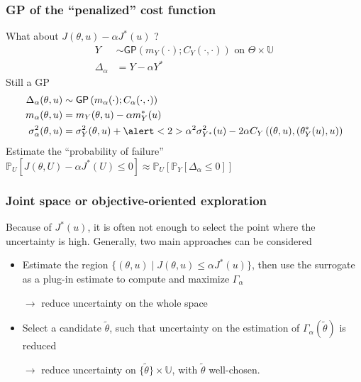 \documentclass[11pt]{beamer}
\newcommand{\GP}{\mathsf{GP}}
\newcommand{\Prob}{\mathbb{P}}
\newcommand{\kk}{\theta}
\newcommand{\uu}{u}
\newcommand{\UU}{U}
\newcommand{\Uspace}{\mathbb{U}}
\newcommand{\Kspace}{\Theta}
\begin{document}
\begin{frame}
  \frametitle{GP of the ``penalized'' cost function}
   What about $J(\kk, \uu) - \alpha J^*(\uu)$ ?
  \begin{align}
    Y &\sim \GP\left(m_Y(\cdot); C_Y(\cdot, \cdot)\right) \text{ on } \Kspace \times \Uspace \\
    \Delta_{\alpha} &= Y - \alpha Y^*
  \end{align}
  Still a GP
  \begin{align}
    \Delta_{\alpha}(\kk, \uu) &\sim \GP\left(m_{\alpha}(\cdot);C_{\alpha}(\cdot, \cdot) \right) \\
    m_{\alpha}(\kk,\uu)   &= m_Y(\kk, \uu) - \alpha m_Y^*(\uu) \\
    \sigma^2_{\alpha}(\kk, \uu) &= \sigma^2_{Y}(\kk, \uu) +  \alert<2>{\alpha^2\sigma^2_{Y^*}(\uu)}- 2\alpha C_Y\left((\kk, \uu), ({\kk}_Y^ *(\uu), \uu)\right)
  \end{align}
  Estimate the  ``probability of failure''~\cite{bect_sequential_2012,echard_ak-mcs_2011}
 $\Prob_{\UU}\left[J(\kk, \UU) - \alpha J^*(\UU) \leq 0\right] \approx \Prob_{\UU}\left[\Prob_Y\left[\Delta_{\alpha} \leq 0\right]\right]$
  \end{frame}
\begin{frame}
  \frametitle{Joint space or objective-oriented exploration}
  Because of $J^*(\uu)$, it is often not enough to select the point where the uncertainty is high.
  Generally, two main approaches can be considered
  \begin{itemize}
  \item Estimate the region $\{(\kk, \uu) \mid J(\kk,\uu) \leq \alpha J^*(\uu)\}$, then use the surrogate as a plug-in estimate to compute and maximize $\Gamma_{\alpha}$

    $\rightarrow$ reduce uncertainty on the whole space
  \item Select a candidate $\tilde{\kk}$, such that uncertainty on the estimation of $\Gamma_{\alpha}(\tilde{\kk})$ is reduced

    $\rightarrow$ reduce uncertainty on $\{\tilde{\kk}\}\times\Uspace$, with $\tilde{\kk}$ well-chosen.
  \end{itemize}
\end{frame}
\end{document}
